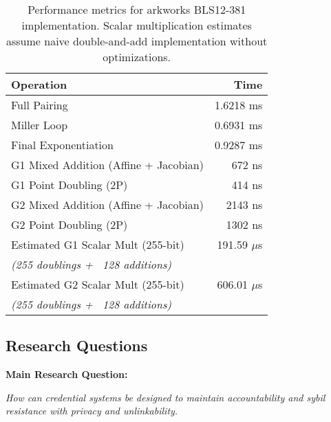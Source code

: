 \begin{table}[h]
\centering
\begin{tabular}{|l|r|}
\hline
\textbf{Operation} & \textbf{Time} \\
\hline
Full Pairing & 1.6218 ms \\
Miller Loop & 0.6931 ms \\
Final Exponentiation & 0.9287 ms \\
G1 Mixed Addition (Affine + Jacobian) & 672 ns \\
G1 Point Doubling (2P) & 414 ns \\
G2 Mixed Addition (Affine + Jacobian) & 2143 ns \\
G2 Point Doubling (2P) & 1302 ns \\
\hline
Estimated G1 Scalar Mult (255-bit) & 191.59 $\mu$s \\
\emph{\small(255 doublings + ~128 additions)} & \\
Estimated G2 Scalar Mult (255-bit) & 606.01 $\mu$s \\
\emph{\small(255 doublings + ~128 additions)} & \\
\hline
\end{tabular}
\caption{Performance metrics for arkworks BLS12-381 implementation. Scalar multiplication estimates assume naive double-and-add implementation without optimizations.}
\label{tab:arkworks-performance}
\end{table}


\newpage
\subsection{Research Questions}
\textbf{Main Research Question: }

\textit{How can credential systems be designed to maintain accountability and sybil resistance with privacy and unlinkability. }

